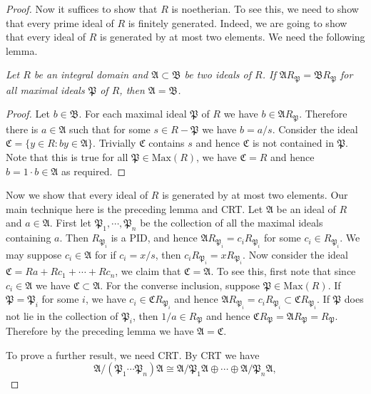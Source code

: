 \begin{proof}
Now it suffices to show that $R$ is noetherian. To see this, we need to show that every prime ideal of $R$ is finitely generated. Indeed, we are going to show that every ideal of $R$ is generated by at most two elements. We need the following lemma.
\begin{lemma}\em
Let $R$ be an integral domain and $\mathfrak{A}\subset\mathfrak{B}$ be two ideals of $R$. If $\mathfrak{A}R_\mathfrak{P}=\mathfrak{B}R_\mathfrak{P}$ for all maximal ideals $\mathfrak{P}$ of $R$, then $\mathfrak{A}=\mathfrak{B}$.
\end{lemma}
\begin{proof}
Let $b\in\mathfrak{B}$. For each maximal ideal $\mathfrak{P}$ of $R$ we have $b\in\mathfrak{A}R_\mathfrak{P}$. Therefore there is $a\in\mathfrak{A}$ such that for some $s\in R-\mathfrak{P}$ we have $b=a/s$. Consider the ideal $\mathfrak{C}=\{y\in R:by\in\mathfrak{A}\}$. Trivially $\mathfrak{C}$ contains $s$ and hence $\mathfrak{C}$ is not contained in $\mathfrak{P}$. Note that this is true for all $\mathfrak{P}\in\mathrm{Max}(R)$, we have $\mathfrak{C}=R$ and hence $b=1\cdot b\in\mathfrak{A}$ as required.
\end{proof}
Now we show that every ideal of $R$ is generated by at most two elements. Our main technique here is the preceding lemma and CRT. Let $\mathfrak{A}$ be an ideal of $R$ and $a\in\mathfrak{A}$. First let $\mathfrak{P}_1,\cdots,\mathfrak{P}_n$ be the collection of all the maximal ideals containing $a$. Then $R_{\mathfrak{P}_i}$ is a PID, and hence $\mathfrak{A}R_{\mathfrak{P}_i}=c_iR_{\mathfrak{P}_i}$ for some $c_i\in R_{\mathfrak{P}_i}$. We may suppose $c_i\in\mathfrak{A}$ for if $c_i=x/s$, then $c_iR_{\mathfrak{P}_i}=xR_{\mathfrak{P}_i}$. Now consider the ideal $\mathfrak{C}=Ra+Rc_1+\cdots+Rc_n$, we claim that $\mathfrak{C}=\mathfrak{A}$. To see this, first note that since $c_i\in\mathfrak{A}$ we have $\mathfrak{C}\subset\mathfrak{A}$. For the converse inclusion, suppose $\mathfrak{P}\in\mathrm{Max}(R)$. If $\mathfrak{P}=\mathfrak{P}_i$ for some $i$, we have $c_i\in\mathfrak{C}R_{\mathfrak{P}_i}$ and hence $\mathfrak{A}R_{\mathfrak{P}_i}=c_iR_{\mathfrak{P}_i}\subset\mathfrak{C}R_{\mathfrak{P}_i}$. If $\mathfrak{P}$ does not lie in the collection of $\mathfrak{P}_i$, then $1/a\in R_{\mathfrak{P}}$ and hence $\mathfrak{C}R_{\mathfrak{P}}=\mathfrak{A}R_{\mathfrak{P}}=R_{\mathfrak{P}}$. Therefore by the preceding lemma we have $\mathfrak{A}=\mathfrak{C}$.\par
To prove a further result, we need CRT. By CRT we have 
$$
\mathfrak{A} /\left( \mathfrak{P} _1\cdots \mathfrak{P} _n \right) \mathfrak{A} \cong \mathfrak{A} /\mathfrak{P} _1\mathfrak{A} \oplus \cdots \oplus \mathfrak{A} /\mathfrak{P} _n\mathfrak{A} ,
$$
\end{proof}
